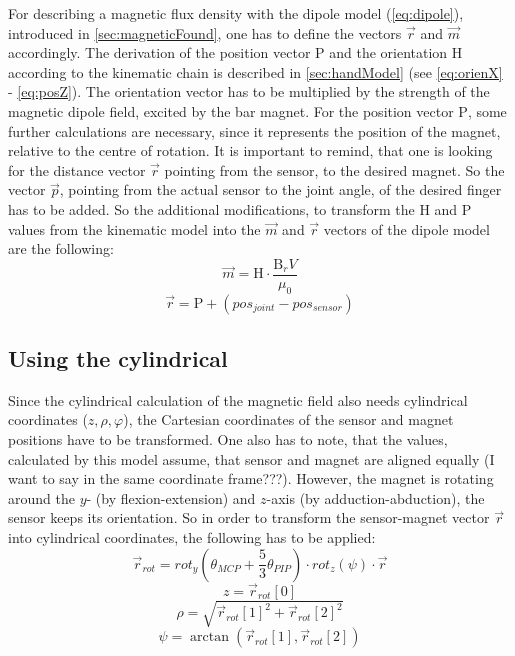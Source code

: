 For describing a magnetic flux density with the dipole model (\ref{eq:dipole}), introduced in \ref{sec:magneticFound}, one has to define the vectors $ \vec{r} $ and $ \vec{m} $ accordingly. The derivation of the position vector $ \mathrm{P} $  and the orientation $ \mathrm{H} $ according to the kinematic chain is described in \ref{sec:handModel} (see \ref{eq:orienX} - \ref{eq:posZ}). The orientation vector has to be multiplied by the strength of the magnetic dipole field, excited by the bar magnet. For the position vector $ \mathrm{P} $, some further calculations are necessary, since it represents the position of the magnet, relative to the centre of rotation. It is important to remind, that one is looking for the distance vector $ \vec{r} $ pointing from the sensor, to the desired magnet. So the vector $ \vec{p} $, pointing from the actual sensor to the joint angle, of the desired finger has to be added. So the additional modifications, to transform the $ \mathrm{H} $ and $ \mathrm{P} $ values from the kinematic model into the $ \vec{m} $ and $ \vec{r} $ vectors of the dipole model are the following:\\
\begin{equation}
\vec{m} = \mathrm{H} \cdot \frac{\mathrm{B}_r V}{\mu_{0}}
\end{equation}
\begin{equation}
\vec{r} = \mathrm{P} + (pos_{joint} - pos_{sensor})
\end{equation}


\subsection{Using the cylindrical} \label{subsec:implCyl}

Since the cylindrical calculation of the magnetic field also needs cylindrical coordinates ($ z, \rho, \varphi $), the Cartesian coordinates of the sensor and magnet positions have to be transformed. One also has to note, that the values, calculated by this model assume, that sensor and magnet are aligned equally (I want to say in the same coordinate frame???). However, the magnet is rotating around the $ y $- (by flexion-extension) and $ z $-axis (by adduction-abduction), the sensor keeps its orientation. So in order to transform the sensor-magnet vector $ \vec{r} $ into cylindrical coordinates, the following has to be applied:\\
\begin{equation}
\vec{r}_{rot} = rot_{y}(\theta_{MCP} + \frac{5}{3} \theta_{PIP}) \cdot rot_{z}(\psi) \cdot \vec{r}
\end{equation}
\begin{equation}
z = \vec{r}_{rot}[0]
\end{equation}
\begin{equation}
\rho = \sqrt{\vec{r}_{rot}[1]^{2} + \vec{r}_{rot}[2]^2}
\end{equation}
\begin{equation}
\psi = \arctan(\vec{r}_{rot}[1], \vec{r}_{rot}[2])
\end{equation}

